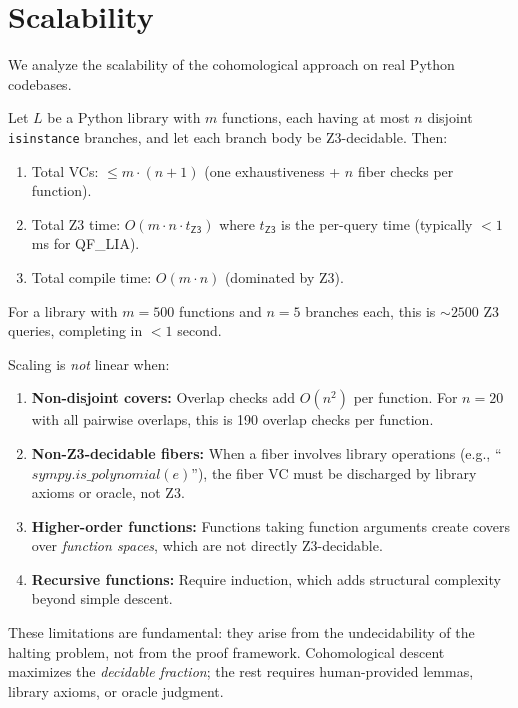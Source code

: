 \section{Scalability}
\label{sec:scalability}

We analyze the scalability of the cohomological approach on
real Python codebases.

\begin{theorem}
\label{thm:linear-scaling}
Let $L$ be a Python library with $m$ functions, each having
at most $n$ disjoint \texttt{isinstance} branches, and let
each branch body be Z3-decidable.  Then:
\begin{enumerate}
\item Total VCs: $\leq m \cdot (n + 1)$ (one exhaustiveness
  + $n$ fiber checks per function).
\item Total Z3 time: $O(m \cdot n \cdot t_\mathsf{Z3})$ where
  $t_\mathsf{Z3}$ is the per-query time (typically $< 1$ms
  for QF\_LIA).
\item Total compile time: $O(m \cdot n)$ (dominated by Z3).
\end{enumerate}
For a library with $m = 500$ functions and $n = 5$ branches
each, this is $\sim 2500$ Z3 queries, completing in
$< 1$ second.
\end{theorem}

\begin{remark}
Scaling is \emph{not} linear when:
\begin{enumerate}
\item \textbf{Non-disjoint covers:} Overlap checks add $O(n^2)$
  per function.  For $n = 20$ with all pairwise overlaps,
  this is 190 overlap checks per function.
\item \textbf{Non-Z3-decidable fibers:} When a fiber involves
  library operations (e.g., ``$\mathit{sympy.is\_polynomial}(e)$''),
  the fiber VC must be discharged by library axioms or oracle,
  not Z3.
\item \textbf{Higher-order functions:} Functions taking function
  arguments create covers over \emph{function spaces}, which
  are not directly Z3-decidable.
\item \textbf{Recursive functions:} Require induction, which
  adds structural complexity beyond simple descent.
\end{enumerate}
These limitations are fundamental: they arise from the
undecidability of the halting problem, not from the proof
framework.  Cohomological descent maximizes the \emph{decidable
fraction}; the rest requires human-provided lemmas, library
axioms, or oracle judgment.
\end{remark}


